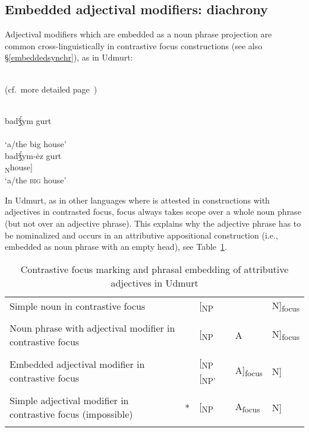
\subsection{Embedded adjectival modifiers: diachrony}
\label{embeddeddiachr}
Adjectival modifiers which are embedded as a noun phrase projection are common cross-linguistically in contrastive focus constructions (see also \S\ref{embeddedsynchr}), as in Udmurt:
\begin{exe}
\\{\rm (cf.~more detailed page~\pageref{udmurt synchr})}
\begin{xlist}
\\
\gll	{}		badǯ́ym gurt\\
	[\textsubscript{NP} \textsubscript{A}big \textsubscript{N}house]\\
\glt	‘a/the big house’
\\
\gll	{}		{}			badǯ́ym-ėz gurt\\
	[\textsubscript{NP} [\textsubscript{NP'} \textsubscript{A}big-\textsc{nmlz}] \textsubscript{N}house]\\
\glt	‘a/the \textsc{big} house’
\end{xlist}
\end{exe}
In Udmurt, as in other languages where  is attested in constructions with adjectives in contrasted focus, focus always takes scope over a whole noun phrase (but not over an adjective phrase). This explains why the adjective phrase has to be nominalized and occurs in an attributive appositional construction (i.e., embedded as noun phrase with an empty head), see Table~\ref{udm-nom}.
\begin{table}
\begin{tabularx}{\textwidth}{p{} >{\large}r >{\large}X >{\large}X >{\large}X}
\lsptoprule
\raggedright
Simple noun in contrastive focus					&	&[\textsubscript{NP} 					&					&N]\textsubscript{focus}\\
\\
\raggedright
Noun phrase with adjectival modifier in contrastive focus	&	&[\textsubscript{NP} 					&A 					&N]\textsubscript{focus}\\
\\
\raggedright
Embedded adjectival modifier in contrastive focus		&	&[\textsubscript{NP} [\textsubscript{NP'} 	&A]\textsubscript{focus} 	&N]\\
\\
\raggedright
Simple adjectival modifier in contrastive focus (impossible)&{*}	&[\textsubscript{NP} 					&A\textsubscript{focus} 	&N]\\
\lspbottomrule
\end{tabularx}
\caption[Contrastive focus and phrasal embedding]{Contrastive focus marking and phrasal embedding of attributive adjectives in Udmurt}
\label{udm-nom}
\end{table}
